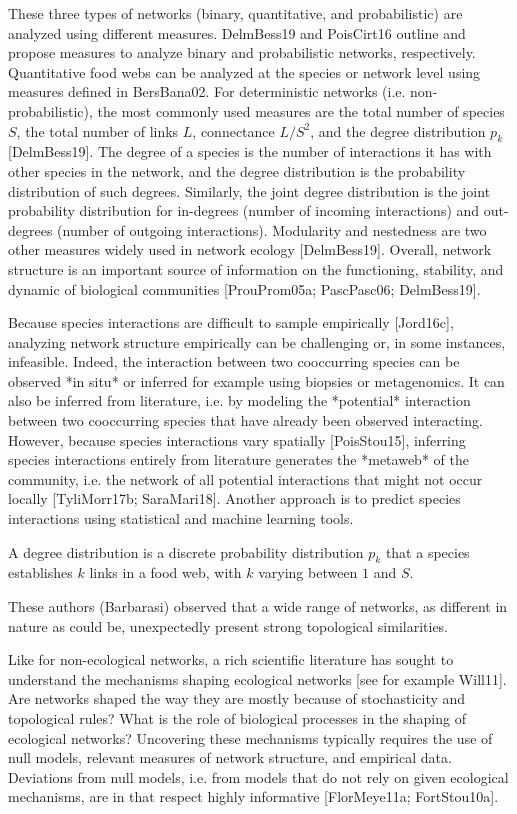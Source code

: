 These three types of networks (binary, quantitative, and probabilistic) are
analyzed using different measures. DelmBess19 and PoisCirt16 outline and
propose measures to analyze binary and probabilistic networks, respectively.
Quantitative food webs can be analyzed at the species or network level using
measures defined in BersBana02. For deterministic networks (i.e.
non-probabilistic), the most commonly used measures are the total number of
species $S$, the total number of links $L$, connectance $L/S^2$, and the degree
distribution $p_k$ [DelmBess19]. The degree of a species is the number of
interactions it has with other species in the network, and the degree
distribution is the probability distribution of such degrees. Similarly, the
joint degree distribution is the joint probability distribution for in-degrees
(number of incoming interactions) and out-degrees (number of outgoing
interactions). Modularity and nestedness are two other measures widely used in
network ecology [DelmBess19]. Overall, network structure is an important source
of information on the functioning, stability, and dynamic of biological
communities [ProuProm05a; PascPasc06; DelmBess19].

Because species interactions are difficult to sample empirically [Jord16c],
analyzing network structure empirically can be challenging or, in some
instances, infeasible. Indeed, the interaction between two cooccurring species
can be observed *in situ* or inferred for example using biopsies or
metagenomics. It can also be inferred from literature, i.e. by modeling the
*potential* interaction between two cooccurring species that have already been
observed interacting. However, because species interactions vary spatially
[PoisStou15], inferring species interactions entirely from literature generates
the *metaweb* of the community, i.e. the network of all potential interactions
that might not occur locally [TyliMorr17b; SaraMari18]. Another approach is to
predict species interactions using statistical and machine learning tools.

A degree
distribution is a discrete probability distribution $p_k$ that a species
establishes $k$ links in a food web, with $k$ varying between $1$ and $S$.

These authors (Barbarasi) observed that a wide range of
networks, as different in nature as could be, unexpectedly present strong
topological similarities.

Like
for non-ecological networks, a rich scientific literature has sought to
understand the mechanisms shaping ecological networks [see for example Will11].
Are networks shaped the way they are mostly because of stochasticity and
topological rules? What is the role of biological processes in the shaping of
ecological networks? Uncovering these mechanisms typically requires the use of
null models, relevant measures of network structure, and empirical data.
Deviations from null models, i.e. from models that do not rely on given
ecological mechanisms, are in that respect highly informative [FlorMeye11a;
FortStou10a].


